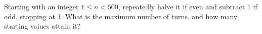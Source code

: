 Starting with an integer $ 1\le n<500 $, repeatedly halve it if even and subtract 1 if odd, stopping at 1. What is the maximum number of turns, and how many starting values attain it?
